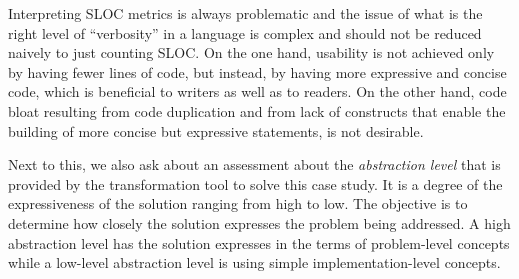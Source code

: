 Interpreting SLOC metrics is always problematic and the issue of what is the right level of ``verbosity'' in a language is complex and should not be reduced naively to just counting SLOC.
On the one hand, usability is not achieved only by having fewer lines of code, but instead, by having more expressive and concise code, which is beneficial to writers as well as to readers.
On the other hand, code bloat resulting from code duplication and from lack of constructs that enable the building of more concise but expressive statements, is not desirable.

Next to this, we also ask about an assessment about the \emph{abstraction level} that is provided by the transformation tool to solve this case study.
It is a degree of the expressiveness of the solution ranging from high to low.
The objective is to determine how closely the solution expresses the problem being addressed.
A high abstraction level has the solution expresses in the terms of problem-level concepts while a low-level abstraction level is using simple implementation-level concepts.
